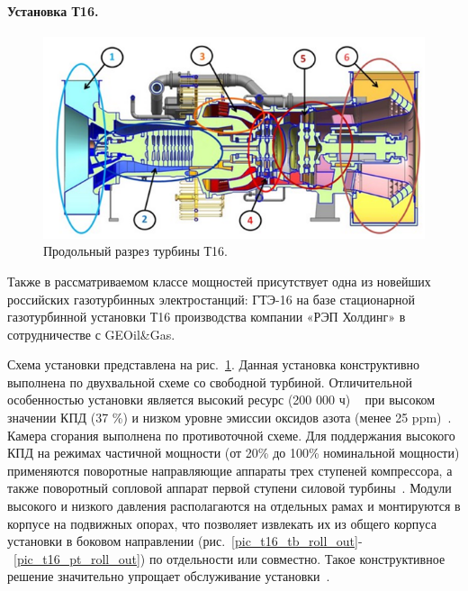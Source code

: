 \documentclass[a4paper,12pt]{article}
\begin{document}
    \paragraph{Установка Т16.}
    \begin{figure}[h!]
        \centering
        \includegraphics[scale=1.0]{./pictures/T16.png}
        \caption{Продольный разрез турбины Т16.}
        \label{pic_t16}
    \end{figure}

    Также в рассматриваемом классе мощностей присутствует одна из новейших российских газотурбинных электростанций:
    ГТЭ-16 на базе стационарной газотурбинной установки Т16 производства компании «РЭП Холдинг» в сотрудничестве с
    GEOil\&Gas.

    Схема установки представлена на рис.~\ref{pic_t16}.
    Данная установка конструктивно выполнена по двухвальной схеме со свободной турбиной.
    Отличительной особенностью установки является высокий ресурс (200 000 ч) ~\cite{rep_holding} при высоком значении КПД (37 \%)
    и низком уровне эмиссии оксидов азота (менее 25 ppm)~\cite{turbineT16}.
    Камера сгорания выполнена по противоточной схеме.
    Для поддержания высокого КПД на режимах частичной мощности (от 20\% до 100\% номинальной мощности)
    применяются поворотные направляющие аппараты трех ступеней компрессора, а также поворотный сопловой
    аппарат первой ступени силовой турбины~\cite{turbineT16}.
    Модули высокого и низкого давления располагаются на отдельных рамах и монтируются в корпусе на
    подвижных опорах, что позволяет извлекать их из общего корпуса установки в боковом направлении
    (рис.~\ref{pic_t16_tb_roll_out}-~\ref{pic_t16_pt_roll_out}) по отдельности или совместно.
    Такое конструктивное решение значительно упрощает обслуживание установки~\cite{turbineT16}.
\end{document}
